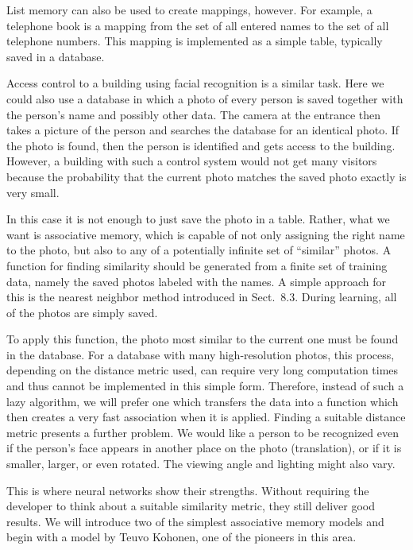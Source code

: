 \documentclass[10pt]{book}
\begin{document}
List memory can also be used to create mappings, however. For example, a telephone book is a mapping from the set of all entered names to the set of all telephone numbers. This mapping is implemented as a simple table, typically saved in a database.

Access control to a building using facial recognition is a similar task. Here we could also use a database in which a photo of every person is saved together with the person's name and possibly other data. The camera at the entrance then takes a picture of the person and searches the database for an identical photo. If the photo is found, then the person is identified and gets access to the building. However, a building with such a control system would not get many visitors because the probability that the current photo matches the saved photo exactly is very small.

In this case it is not enough to just save the photo in a table. Rather, what we want is associative memory, which is capable of not only assigning the right name to the photo, but also to any of a potentially infinite set of ``similar'' photos. A function for finding similarity should be generated from a finite set of training data, namely the saved photos labeled with the names. A simple approach for this is the nearest neighbor method introduced in Sect.\ 8.3. During learning, all of the photos are simply saved.

To apply this function, the photo most similar to the current one must be found in the database. For a database with many high-resolution photos, this process, depending on the distance metric used, can require very long computation times and thus cannot be implemented in this simple form. Therefore, instead of such a lazy algorithm, we will prefer one which transfers the data into a function which then creates a very fast association when it is applied.
Finding a suitable distance metric presents a further problem. We would like a person to be recognized even if the person's face appears in another place on the photo (translation), or if it is smaller, larger, or even rotated. The viewing angle and lighting might also vary.

This is where neural networks show their strengths. Without requiring the developer to think about a suitable similarity metric, they still deliver good results. We will introduce two of the simplest associative memory models and begin with a model by Teuvo Kohonen, one of the pioneers in this area.
\end{document}
